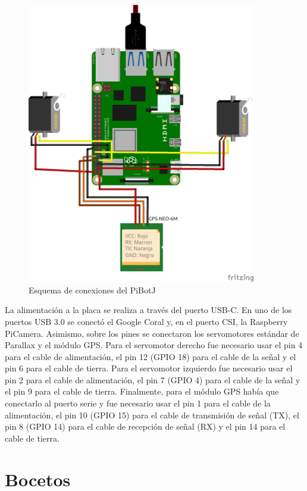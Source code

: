 \begin{figure} [h!]
	\begin{center}
		\includegraphics[width=10cm]{figs/cap5/modelocompleto_bb3.png}
	\end{center}
	\caption{Esquema de conexiones del PiBotJ} 
	\label{fig:fritzzing}
\end{figure}


La alimentación a la placa se realiza a través del puerto USB-C. En uno de los puertos USB 3.0 se conectó el Google Coral y, en el puerto \acs{CSI}, la Raspberry PiCamera. Asimismo, sobre los pines se conectaron los servomotores estándar de Parallax y el módulo \acs{GPS}. Para el servomotor derecho fue necesario usar el pin 4 para el cable de alimentación, el pin 12 (GPIO 18) para el cable de la señal y el pin 6 para el cable de tierra. Para el servomotor izquierdo fue necesario usar el pin 2 para el cable de alimentación, el pin 7 (GPIO 4) para el cable de la señal y el pin 9 para el cable de tierra. Finalmente, para el módulo \acs{GPS} había que conectarlo al puerto serie y fue necesario usar el pin 1 para el cable de la alimentación, el pin 10 (GPIO 15) para el cable de transmisión de señal (TX), el pin 8 (GPIO 14) para el cable de recepción de señal (RX) y el pin 14 para el cable de tierra. 

 
\section{Bocetos}
\label{sec:bocetos}

